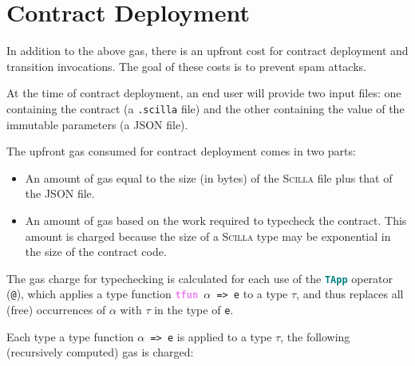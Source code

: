 \documentclass[10pt]{article}
\begin{document}
\section{Contract Deployment}

In addition to the above gas, there is an upfront cost for contract deployment and
transition invocations. The goal of these costs is to prevent spam attacks. 

At the time of contract deployment, an end user will provide two input files:
one containing the contract (a \texttt{.scilla} file) and the other containing
the value of the immutable parameters (a JSON file).

The upfront gas consumed for contract deployment comes in two parts:

\begin{itemize}
\item An amount of gas equal to the size (in bytes) of the
  \textsc{Scilla} file plus that of the JSON file.
\item An amount of gas based on the work required to typecheck the
  contract. This amount is charged because the size of a
  \textsc{Scilla} type may be exponential in the size of the contract
  code.
\end{itemize}

The gas charge for typechecking is calculated for each use of the
\textbf{\texttt{\textcolor{teal}{TApp}}} operator (\texttt{@}), which applies a
type function \texttt{\textbf{\textcolor{violet}{tfun}} $\alpha$ => e}
to a type $\tau$, and thus replaces all (free) occurrences of $\alpha$
with $\tau$ in the type of \texttt{e}.

Each type a type function \texttt{$\alpha$ => e} is applied to a type
$\tau$, the following (recursively computed) gas is charged:
\end{document}
